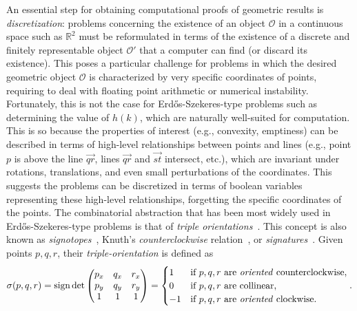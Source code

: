 An essential step for obtaining computational proofs of geometric results is \emph{discretization}: problems concerning the existence of an object $\mathcal{O}$ in a continuous space such as $\mathbb{R}^2$ must be reformulated in terms of the existence of a discrete and finitely representable object $\mathcal{O}'$ that a computer can find (or discard its existence).
This poses a particular challenge for problems in which the desired geometric object $\mathcal{O}$ is characterized by very specific coordinates of points, requiring to deal with floating point arithmetic or numerical instability.
Fortunately, this is not the case for Erd\H{o}s-Szekeres-type problems such as determining the value of $h(k)$, which are naturally well-suited for computation.
This is so because the properties of interest (e.g., convexity, emptiness) can be described in terms of high-level relationships between points and lines (e.g., point $p$ is above the line $\vec{qr}$, lines $\vec{qr}$ and $\vec{st}$ intersect, etc.), which are invariant under rotations, translations, and even small perturbations of the coordinates. This suggests the problems can be discretized in terms of boolean variables representing these high-level relationships, forgetting the specific coordinates of the points.
The combinatorial abstraction that has been most widely used in Erd\H{o}s-Szekeres-type problems is that of \emph{triple orientations}~\cite{ emptyHexagonNumber, scheucherTwoDisjoint5holes2020}. This concept is also known as \emph{signotopes}~\cite{felsnerSweepsArrangementsSignotopes2001,subercaseaux2023minimizing},  Knuth's \emph{counterclockwise} relation~\cite{knuthAxiomsHulls1992}, or \emph{signatures}~\cite{szekeres_peters_2006}.
Given points $p, q, r$, their \emph{triple-orientation} is defined as
\newcommand{\sign}{\operatorname{sign}}
\[
  \sigma(p, q, r) = \sign \det \begin{pmatrix} p_x & q_x & r_x \\ p_y & q_y & r_y \\ 1 & 1 & 1 \end{pmatrix} = \begin{cases}
    1 & \text{if } p, q, r \text{ are \emph{oriented} counterclockwise}, \\
    0 & \text{if } p, q, r \text{ are collinear}, \\
    -1 & \text{if } p, q, r \text{ are \emph{oriented} clockwise}.
  \end{cases}.
\]

